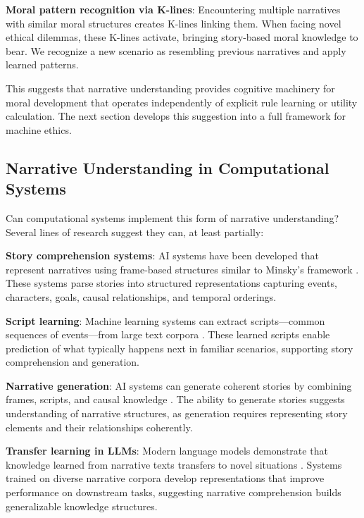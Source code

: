 \documentclass[12pt]{article}
\begin{document}
\textbf{Moral pattern recognition via K-lines}: Encountering multiple narratives with similar moral structures creates K-lines linking them. When facing novel ethical dilemmas, these K-lines activate, bringing story-based moral knowledge to bear. We recognize a new scenario as resembling previous narratives and apply learned patterns.

This suggests that narrative understanding provides cognitive machinery for moral development that operates independently of explicit rule learning or utility calculation. The next section develops this suggestion into a full framework for machine ethics.

\subsection{Narrative Understanding in Computational Systems}

Can computational systems implement this form of narrative understanding? Several lines of research suggest they can, at least partially:

\textbf{Story comprehension systems}: AI systems have been developed that represent narratives using frame-based structures similar to Minsky's framework \citep{mueller2003story, reagan2016emotional}. These systems parse stories into structured representations capturing events, characters, goals, causal relationships, and temporal orderings.

\textbf{Script learning}: Machine learning systems can extract scripts---common sequences of events---from large text corpora \citep{chambers2008unsupervised, regneri2010learning}. These learned scripts enable prediction of what typically happens next in familiar scenarios, supporting story comprehension and generation.

\textbf{Narrative generation}: AI systems can generate coherent stories by combining frames, scripts, and causal knowledge \citep{riedl2010narrative, li2013story}. The ability to generate stories suggests understanding of narrative structures, as generation requires representing story elements and their relationships coherently.

\textbf{Transfer learning in LLMs}: Modern language models demonstrate that knowledge learned from narrative texts transfers to novel situations \citep{devlin2018bert, brown2020language}. Systems trained on diverse narrative corpora develop representations that improve performance on downstream tasks, suggesting narrative comprehension builds generalizable knowledge structures.
\end{document}
